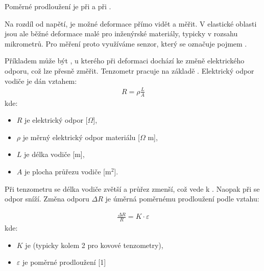 \documentclass[letterpaper,10pt,english]{jupyterBook}
\begin{document}
\sphinxAtStartPar
Poměrné prodloužení je  při  a  při .

\sphinxAtStartPar
Na rozdíl od napětí, je možné deformace přímo vidět a měřit. V elastické oblasti jsou ale běžné deformace malé pro inženýrské materiály, typicky v rozsahu mikrometrů. Pro měření proto využíváme senzor, který se označuje pojmem .

\sphinxAtStartPar
Příkladem může být , u kterého při deformaci dochází ke změně elektrického odporu, což lze přesně změřit.  Tenzometr pracuje na základě . Elektrický odpor vodiče je dán vztahem:
\begin{equation*}
\begin{split}
R = \rho \frac{L}{A}
\end{split}
\end{equation*}
\sphinxAtStartPar
kde:
\begin{itemize}
\item {} 
\sphinxAtStartPar
\(R\) je elektrický odpor {[}\(\Omega\){]},

\item {} 
\sphinxAtStartPar
\(\rho\) je měrný elektrický odpor materiálu {[}\(\Omega\) m{]},

\item {} 
\sphinxAtStartPar
\(L\) je délka vodiče {[}m{]},

\item {} 
\sphinxAtStartPar
\(A\) je plocha průřezu vodiče {[}m\(^2\){]}.

\end{itemize}

\sphinxAtStartPar
Při  tenzometru se délka vodiče zvětší a průřez zmenší, což vede k . Naopak při  se odpor sníží. Změna odporu \(\Delta R\) je úměrná poměrnému prodloužení podle vztahu:

\noindent{}
\begin{equation*}
\begin{split}
\frac{\Delta R}{R} = K \cdot \varepsilon
\end{split}
\end{equation*}
\sphinxAtStartPar
kde:
\begin{itemize}
\item {} 
\sphinxAtStartPar
\(K\) je  (typicky kolem 2 pro kovové tenzometry),

\item {} 
\sphinxAtStartPar
\(\varepsilon\) je poměrné prodloužení {[}1{]}

\end{itemize}
\end{document}
